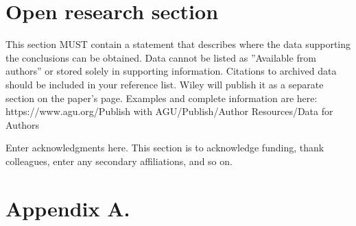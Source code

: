 \documentclass[draft]{AR_analysis_}
\begin{document}
%
%

\section*{Open research section}
This section MUST contain a statement that describes where the data supporting the conclusions
can be obtained. Data cannot be listed as ''Available from authors'' or stored solely in 
supporting information. Citations to archived data should be included in your reference
list. Wiley will publish it as a separate section on the paper’s page. Examples and 
complete information are here:
https://www.agu.org/Publish with AGU/Publish/Author Resources/Data for Authors


\acknowledgments
Enter acknowledgments here. This section is to acknowledge funding, thank colleagues, 
enter any secondary affiliations, and so on.


%
%

%



%
%
%
%
%

\appendix
\section*{Appendix A.}
\end{document}
